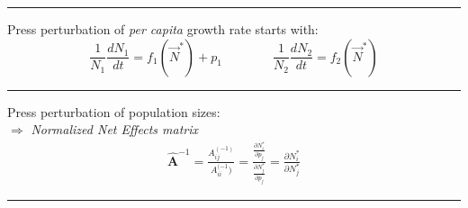 \documentclass{article}
\newcommand{\ind}{\-\hspace{1cm}}
\begin{document}
\rule[0.5ex]{\linewidth}{1pt}

Press perturbation of \emph{per capita} growth rate starts with:\\
\begin{equation*}
	\frac{1}{N_1}\frac{dN_1}{dt}=f_1(\vec{N}^*)+p_1 \qquad \qquad  \frac{1}{N_2}\frac{dN_2}{dt}=f_2(\vec{N}^*)
\end{equation*}

\rule[0.5ex]{\linewidth}{1pt}

Press perturbation of population sizes:\\
\ind $\Rightarrow$ \emph{Normalized Net Effects matrix}
\begin{align*}
\hat{\mathbf{A}}^{-1}=\frac{A_{ij}^{(-1)}}{A_{ii}^{(-1})}=\frac{\frac{\partial N_i^*}{\partial p_j}}{\frac{\partial N_j^*}{\partial p_j}}=\frac{\partial N_i^*}{\partial N_j^*}
\end{align*}



\rule[0.5ex]{\linewidth}{1pt}
\end{document}
